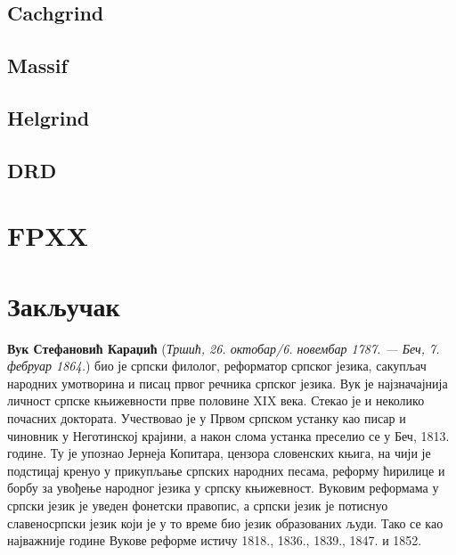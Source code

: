 \documentclass[12pt,oneside]{memoir}
\begin{document}
\section{Cachgrind}

\section{Massif}

\section{Helgrind}

\section{DRD}

\chapter{FPXX}
\label{chp:fpxx}

\chapter{Закључак}

\pangrami

\pangrami

\literatura

\backmatter

\begin{biografija}
\textbf{Вук Стефановић Караџић} (\emph{Тршић, 26. октобар/6. новембар
  1787. — Беч, 7. фебруар 1864.}) био је српски филолог, реформатор
српског језика, сакупљач народних умотворина и писац првог речника
српског језика.  Вук је најзначајнија личност српске књижевности прве
половине XIX века. Стекао је и неколико почасних доктората.
Учествовао је у Првом српском устанку као писар и чиновник у
Неготинској крајини, а након слома устанка преселио се у Беч,
1813. године. Ту је упознао Јернеја Копитара, цензора словенских
књига, на чији је подстицај кренуо у прикупљање српских народних
песама, реформу ћирилице и борбу за увођење народног језика у српску
књижевност. Вуковим реформама у српски језик је уведен фонетски
правопис, а српски језик је потиснуо славеносрпски језик који је у то
време био језик образованих људи. Тако се као најважније године Вукове
реформе истичу 1818., 1836., 1839., 1847. и 1852.
\end{biografija}
\end{document}
